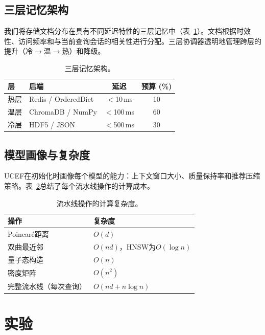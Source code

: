 \documentclass[journal]{IEEEtran}
\newcommand{\ucef}{\textsf{UCEF}}
\begin{document}
\subsection{三层记忆架构}

我们将存储文档分布在具有不同延迟特性的三层记忆中（表~\ref{tab:memory}）。文档根据时效性、访问频率和与当前查询会话的相关性进行分配。三层协调器透明地管理跨层的提升（冷$\to$温$\to$热）和降级。

\begin{table}[t]
\caption{三层记忆架构。}
\label{tab:memory}
\centering
\small
\begin{tabular}{@{}llcc@{}}
\toprule
层 & 后端 & 延迟 & 预算 (\%) \\
\midrule
热层   & Redis / OrderedDict & $<$10\,ms  & 10 \\
温层   & ChromaDB / NumPy    & $<$100\,ms & 60 \\
冷层   & HDF5 / JSON         & $<$500\,ms & 30 \\
\bottomrule
\end{tabular}
\end{table}

\subsection{模型画像与复杂度}

\ucef{}在初始化时画像每个模型的能力：上下文窗口大小、质量保持率和推荐压缩策略。表~\ref{tab:complexity}总结了每个流水线操作的计算成本。

\begin{table}[t]
\caption{流水线操作的计算复杂度。}
\label{tab:complexity}
\centering
\small
\begin{tabular}{@{}ll@{}}
\toprule
操作 & 复杂度 \\
\midrule
Poincar\'{e}距离      & $O(d)$ \\
双曲最近邻 & $O(nd)$，HNSW为$O(\log n)$ \\
量子态构造  & $O(n)$ \\
密度矩阵              & $O(n^{2})$ \\
完整流水线（每次查询）   & $O(nd + n\log n)$ \\
\bottomrule
\end{tabular}
\end{table}


\section{实验}
\label{sec:experiments}
\end{document}
